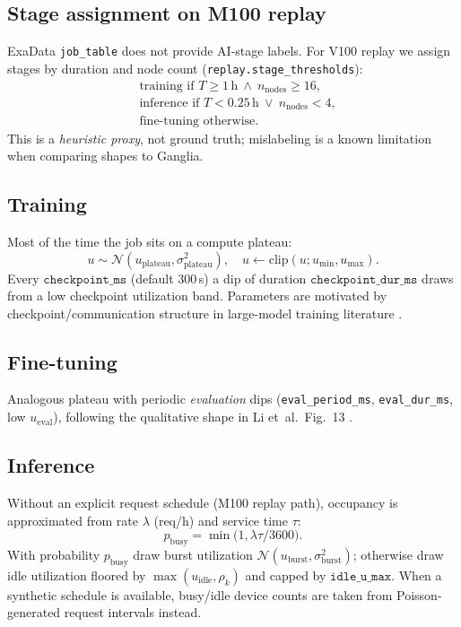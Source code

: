 \documentclass[10pt,a4paper,twocolumn]{article}
\begin{document}
\subsection{Stage assignment on M100 replay}

ExaData \texttt{job\_table} does not provide AI-stage labels. For V100
replay we assign stages by duration and node count
(\texttt{replay.stage\_thresholds}):
\begin{equation}
\begin{aligned}
&\text{training if } T\ge 1\,\mathrm{h}\ \wedge\ n_{\mathrm{nodes}}\ge 16,\\
&\text{inference if } T<0.25\,\mathrm{h}\ \vee\ n_{\mathrm{nodes}}<4,\\
&\text{fine-tuning otherwise.}
\end{aligned}
\end{equation}
This is a \emph{heuristic proxy}, not ground truth; mislabeling is a known
limitation when comparing shapes to Ganglia.

\subsection{Training}

Most of the time the job sits on a compute plateau:
\begin{equation}
  u\sim\mathcal{N}(u_{\mathrm{plateau}},\sigma_{\mathrm{plateau}}^2),
  \quad u\leftarrow\mathrm{clip}(u;u_{\min},u_{\max}).
\end{equation}
Every $\texttt{checkpoint\_ms}$ (default 300\,s) a dip of duration
$\texttt{checkpoint\_dur\_ms}$ draws from a low checkpoint utilization
band. Parameters are motivated by checkpoint/communication structure in
large-model training literature \cite{li2024unseen,shoeybi2019megatron}.

\subsection{Fine-tuning}

Analogous plateau with periodic \emph{evaluation} dips
(\texttt{eval\_period\_ms}, \texttt{eval\_dur\_ms}, low $u_{\mathrm{eval}}$),
following the qualitative shape in Li et~al.\ Fig.~13 \cite{li2024unseen}.

\subsection{Inference}

Without an explicit request schedule (M100 replay path), occupancy is
approximated from rate $\lambda$ (req/h) and service time $\tau$:
\begin{equation}
  p_{\mathrm{busy}}=\min\bigl(1,\lambda\tau/3600\bigr).
\end{equation}
With probability $p_{\mathrm{busy}}$ draw burst utilization
$\mathcal{N}(u_{\mathrm{burst}},\sigma_{\mathrm{burst}}^2)$; otherwise draw
idle utilization floored by $\max(u_{\mathrm{idle}},\rho_k)$ and capped by
$\texttt{idle\_u\_max}$. When a synthetic schedule is available, busy/idle
device counts are taken from Poisson-generated request intervals instead.
\end{document}
